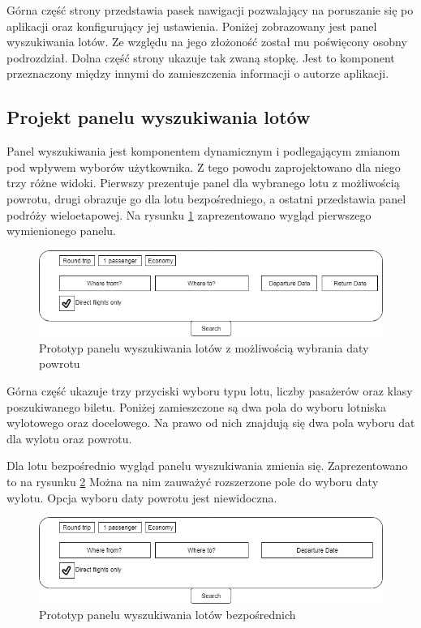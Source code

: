 \documentclass[12pt, twoside]{report}
\begin{document}
Górna część strony przedstawia pasek nawigacji pozwalający na poruszanie się po aplikacji oraz konfigurujący jej ustawienia. Poniżej zobrazowany jest panel wyszukiwania lotów. Ze względu na jego złożoność został mu poświęcony osobny podrozdział. Dolna część strony ukazuje tak zwaną stopkę. Jest to komponent przeznaczony między innymi do zamieszczenia informacji o autorze aplikacji.
\subsection{Projekt panelu wyszukiwania lotów}
Panel wyszukiwania jest komponentem dynamicznym i podlegającym zmianom pod wpływem wyborów użytkownika. Z tego powodu zaprojektowano dla niego trzy różne widoki. Pierwszy prezentuje panel dla wybranego lotu z możliwością powrotu, drugi obrazuje go dla lotu bezpośredniego, a ostatni przedstawia panel podróży wieloetapowej. Na rysunku \ref{fig:interface_project_departure} zaprezentowano wygląd pierwszego wymienionego panelu.
\begin{figure}[!ht]
\centering
\includegraphics[scale=0.60, keepaspectratio]{interface_project_departure.PNG}
\caption{Prototyp panelu wyszukiwania lotów z możliwością wybrania daty powrotu}
\label{fig:interface_project_departure}
\end{figure}

\noindent Górna część ukazuje trzy przyciski wyboru typu lotu, liczby pasażerów oraz klasy poszukiwanego biletu. Poniżej zamieszczone są dwa pola do wyboru lotniska wylotowego oraz docelowego. Na prawo od nich znajdują się dwa pola wyboru dat dla wylotu oraz powrotu.

Dla lotu bezpośrednio wygląd panelu wyszukiwania zmienia się. Zaprezentowano to na rysunku \ref{fig:interface_project_direct} Można na nim zauważyć rozszerzone pole do wyboru daty wylotu. Opcja wyboru daty powrotu jest niewidoczna.
\begin{figure}[!ht]
\centering
\includegraphics[scale=0.60, keepaspectratio]{interface_project_direct.PNG}
\caption{Prototyp panelu wyszukiwania lotów bezpośrednich}
\label{fig:interface_project_direct}
\end{figure}
\end{document}
